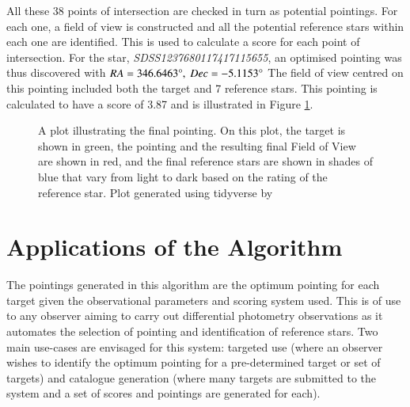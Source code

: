 \documentclass{aa}
\begin{document}
All these 38 points of intersection are checked in turn as potential pointings. For each one, a field of view is constructed and all the potential reference stars within each one are identified. This is used to calculate a score for each point of intersection. For the star, \textit{SDSS1237680117417115655}, an optimised pointing was thus discovered with ${RA = 346.6463\degree},\ {Dec = -5.1153\degree}$ The field of view centred on this pointing included both the target and 7 reference stars. This pointing is calculated to have a score of 3.87 and is illustrated in Figure \ref{locus_plot}.

\begin{figure}[!htb]
\caption{\label{locus_plot}A plot illustrating the final pointing.  On this plot, the target is shown in green, the pointing and the resulting final Field of View are shown in red, and the final reference stars are shown in shades of blue that vary from light to dark based on the rating of the reference star. Plot generated using tidyverse by \citet{tidyverse}}
\end{figure}


\section{Applications of the Algorithm}
\label{Applications}
The pointings generated in this algorithm are the optimum pointing for each target given the observational parameters and scoring system used. This is of use to any observer aiming to carry out differential photometry observations as it automates the selection of pointing and identification of reference stars. Two main use-cases are envisaged for this system: targeted use (where an observer wishes to identify the optimum pointing for a pre-determined target or set of targets) and catalogue generation (where many targets are submitted to the system and a set of scores and pointings are generated for each). 
\end{document}
